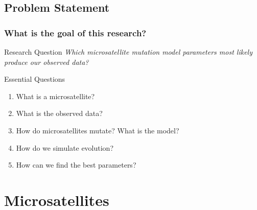 \documentclass[11pt]{beamer}
\begin{document}
	\subsection{Problem Statement}\label{subsec:ps}
	\begin{frame}
		\frametitle{What is the goal of this research?}
        \begin{block}{Research Question}
            \emph{Which microsatellite mutation model parameters most likely produce our observed data?}
        \end{block} \medskip

        \begin{block}{Essential Questions}
            \begin{enumerate}
                \item What is a microsatellite?
                \item What is the observed data?
                \item How do microsatellites mutate?
                    What is the model?
                \item How do we simulate evolution?
                \item How can we find the best parameters?
            \end{enumerate}
        \end{block}

	\end{frame}

	\section{Microsatellites}\label{sec:mi}
\end{document}
